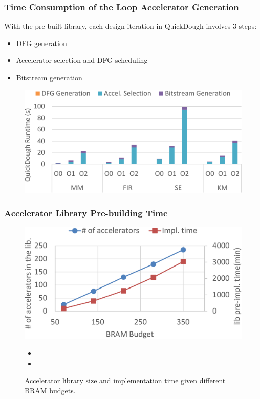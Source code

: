 \documentclass[accentcolor=tud1a,colorbacktitle,inverttitle,landscape,german,presentation,t]{tudbeamer}
\begin{document}
  \begin{frame}
  \frametitle{Time Consumption of the Loop Accelerator Generation}
  \vspace{-0.8em}
  With the pre-built library, each design iteration in QuickDough involves 3 steps:
  \begin{itemize}
    \item DFG generation
    \item Accelerator selection and DFG scheduling
    \item Bitstream generation
  \end{itemize}
  \begin{figure}
    \includegraphics[width=0.8\linewidth]{quickdough-runtime}
  \end{figure}
  \end{frame}

  \begin{frame}
  \frametitle{Accelerator Library Pre-building Time}
  \begin{figure}
  \centering
  \includegraphics[width=0.6\linewidth]{lib-impl-time}
  \caption{Accelerator library size and implementation time given different BRAM budgets.}
  \label{fig:lib-impl-time}
  \begin{itemize}
  \item \color{red}{With simple empirical constraints, the accelerator library pre-building time will not increase dramatically with the BRAM budgets. }
  \item \color{red}{The implementations are completely independent and can be done on a distributed computing system with much shorter time.}
  \end{itemize}
  \end{figure}
  \end{frame}
\end{document}
